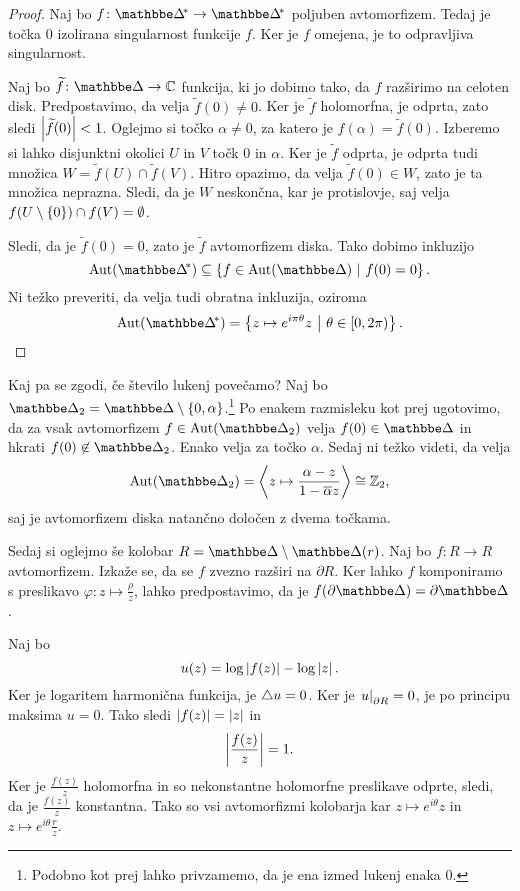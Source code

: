\begin{proof}
Naj bo $f \colon \dskx \to \dskx$ poljuben avtomorfizem. Tedaj je
točka $0$ izolirana singularnost funkcije $f$. Ker je $f$ omejena,
je to odpravljiva singularnost.

Naj bo $\widetilde{f} \colon \dsk \to \C$ funkcija, ki jo dobimo
tako, da $f$ razširimo na celoten disk. Predpostavimo, da velja
$\widetilde{f}(0) \ne 0$. Ker je $\widetilde{f}$ holomorfna, je
odprta, zato sledi $\left\lvert \widetilde{f}(0)\right\rvert < 1$. Oglejmo si točko
$\alpha \ne 0$, za katero je $f(\alpha) = \widetilde{f}(0)$.
Izberemo si lahko disjunktni okolici $U$ in $V$ točk $0$ in
$\alpha$. Ker je $\widetilde{f}$ odprta, je odprta tudi množica
$W = \widetilde{f}(U) \cap \widetilde{f}(V)$. Hitro opazimo, da
velja $\widetilde{f}(0) \in W$, zato je ta množica neprazna.
Sledi, da je $W$ neskončna, kar je protislovje, saj velja
$f(U \setminus \left\{0\right\}) \cap f(V) = \emptyset$.

Sledi, da je $\widetilde{f}(0) = 0$, zato je $\widetilde{f}$
avtomorfizem diska. Tako dobimo inkluzijo
\[
\Aut(\dskx) \subseteq \setb{f \in \Aut(\dsk)}{f(0) = 0}.
\]
Ni težko preveriti, da velja tudi obratna inkluzija, oziroma
\[
\Aut(\dskx) =
\setb{z \mapsto e^{i \pi \theta} z}{\theta \in [0, 2\pi)}.
\qedhere
\]
\end{proof}

Kaj pa se zgodi, če število lukenj povečamo? Naj bo
$\dsk_2 = \dsk \setminus \set{0, \alpha}$.\footnote{Podobno kot
prej lahko privzamemo, da je ena izmed lukenj enaka $0$.} Po
enakem razmisleku kot prej ugotovimo, da za vsak avtomorfizem
$f \in \Aut(\dsk_2)$ velja $f(0) \in \dsk$ in hkrati
$f(0) \not \in \dsk_2$. Enako velja za točko $\alpha$. Sedaj ni
težko videti, da velja
\[
\Aut(\dsk_2) =
\skl{z \mapsto \frac{\alpha - z}{1 - \oline{\alpha} z}} \cong
\Z_2,
\]
saj je avtomorfizem diska natančno določen z dvema točkama.

Sedaj si oglejmo še kolobar $R = \dsk \setminus \dsk(r)$. Naj bo
$f \colon R \to R$ avtomorfizem. Izkaže se, da se $f$ zvezno
razširi na $\partial R$. Ker lahko $f$ komponiramo s preslikavo
$\varphi \colon z \mapsto \frac{\rho}{z}$, lahko predpostavimo, da
je $f(\partial \dsk) = \partial \dsk$.

Naj bo
\[
u(z) = \log \left\lvert f(z)\right\rvert - \log \left\lvert z\right\rvert.
\]
Ker je logaritem harmonična funkcija, je $\mathop{}\!\mathbin\bigtriangleup u = 0$. Ker je
$\left. u\right|_{\partial R}^{} = 0$, je po principu maksima $u = 0$. Tako
sledi $\left\lvert f(z)\right\rvert = \left\lvert z\right\rvert$ in
\[
\left\lvert \frac{f(z)}{z}\right\rvert = 1.
\]
Ker je $\frac{f(z)}{z}$ holomorfna in so nekonstantne holomorfne
preslikave odprte, sledi, da je $\frac{f(z)}{z}$ konstantna. Tako
so vsi avtomorfizmi kolobarja kar $z \mapsto e^{i \theta} z$ in
$z \mapsto e^{i \theta} \frac{r}{z}$.


